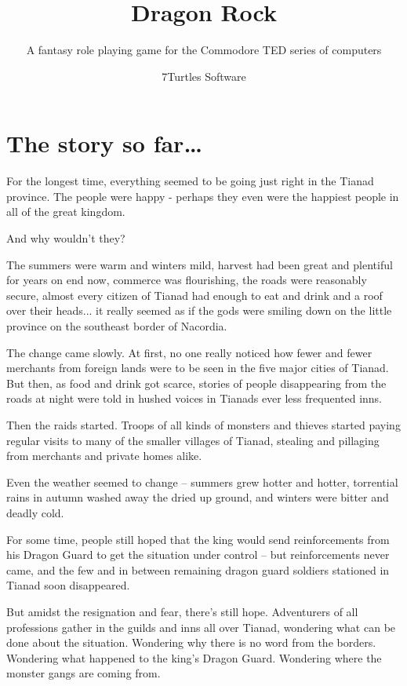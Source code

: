 \documentclass[12pt]{scrbook}
\begin{document}
\title{Dragon Rock}
\subtitle{A fantasy role playing game for the Commodore TED series of computers}
\author{7Turtles Software}
\maketitle

\chapter*{The story so far\dots}

For the longest time, everything seemed to be going just right in the Tianad province. The people were happy - perhaps they even were the happiest people in all of the great kingdom.

And why wouldn't they?

The summers were warm and winters mild, harvest had been great and plentiful for years on end now, commerce was flourishing, the roads were reasonably secure, almost every citizen of Tianad had enough to eat and drink and a roof over their heads... it really seemed as if the gods were smiling down on the little province on the southeast border of Nacordia.

The change came slowly. At first, no one really noticed how fewer and fewer merchants from foreign lands were to be seen in the five major cities of Tianad. But then, as food and drink got scarce, stories of people disappearing from the roads at night were told in hushed voices in Tianads ever less frequented inns.

Then the raids started. Troops of all kinds of monsters and thieves started paying regular visits to many of the smaller villages of Tianad, stealing and pillaging from merchants and private homes alike.

Even the weather seemed to change -- summers grew hotter and hotter, torrential rains in autumn washed away the dried up ground, and winters were bitter and deadly cold.

For some time, people still hoped that the king would send reinforcements from his Dragon Guard to get the situation under control -- but reinforcements never came, and the few and in between remaining dragon guard soldiers stationed in Tianad soon disappeared.

\medskip

But amidst the resignation and fear, there's still hope. Adventurers of all professions gather in the guilds and inns all over Tianad, wondering what can be done about the situation. Wondering why there is no word from the borders. Wondering what happened to the king's Dragon Guard. Wondering where the monster gangs are coming from.
\end{document}

